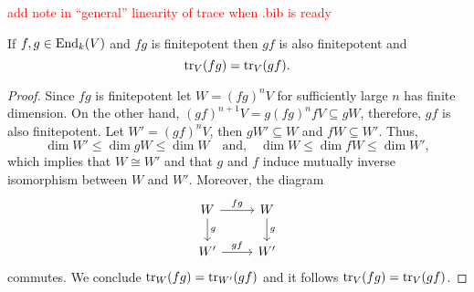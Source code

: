 \textcolor{red}{add note in ``general'' linearity of trace when .bib is ready}
\begin{proposition}\label{prop:trace-inavriant-under-commutator}
	If $f,g \in \operatorname{End}_{k}(V)$ and $fg$ is finitepotent then $gf$ is also finitepotent and 
	\[
		\operatorname{tr}_{V}(fg) = \operatorname{tr}_{V}(gf).
	\]
\end{proposition}
\begin{proof}
	Since $fg$ is finitepotent let $W =(fg)^{n}V$ for sufficiently large $n$ has finite dimension. On the other hand, $(gf)^{n+1}V= g(fg)^{n}fV \subseteq gW$, therefore, $gf$ is also finitepotent. Let $W' = (gf)^{n}V$, then $gW' \subseteq W$ and $fW \subseteq W'$. Thus, 
	\[
		\dim W' \leq \dim gW \leq \dim W\quad\text{and,}\quad\dim W \leq \dim fW \leq \dim W',
	\]
	which implies that $W\cong W'$ and that $g$ and $f$ induce mutually inverse isomorphism between $W$ and $W'$. Moreover, the diagram
	\[
		\begin{tikzcd}
			W \arrow[r, "fg"]\arrow[d, "g"] & W \arrow[d, "g"] \\
			W' \arrow[r, "gf"] & W'
		\end{tikzcd}
	\]
	commutes. We conclude $\operatorname{tr}_{W}(fg) = \operatorname{tr}_{W'}(gf)$ and it follows $\operatorname{tr}_{V}(fg) = \operatorname{tr}_{V}(gf)$.
\end{proof}







